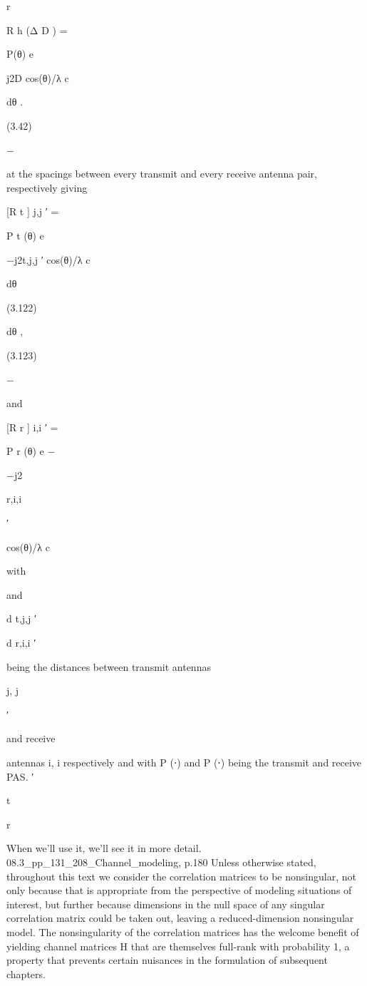 {{{{r

\pi

R h (Δ D ) = \int

P(θ) e

j2 D cos(θ)/λ c

dθ .

(3.42)

−\pi

at the spacings between every transmit and every receive antenna pair, respectively giving
\pi

[R t ] j,j ′ = \int

P t (θ) e

−j2\pid t,j,j ′ cos(θ)/λ c

dθ

(3.122)

dθ ,

(3.123)

−\pi

and
\pi

[R r ] i,i ′ = \int

P r (θ) e
−\pi

−j2\pid

r,i,i

′

cos(θ)/λ c

with

and

d t,j,j ′

d r,i,i ′

being the distances between transmit antennas

j, j

′

and receive

antennas i, i respectively and with P (⋅) and P (⋅) being the transmit and receive PAS.
′

t

r

When we'll use it, we'll see it in more detail.
08.3_pp_131_208_Channel_modeling, p.180 Unless otherwise stated, throughout this text we consider the correlation matrices to be nonsingular, not only because that is appropriate from the perspective of modeling situations of interest, but further because dimensions in the null space of any singular correlation matrix could be taken out, leaving a reduced-dimension nonsingular model. The nonsingularity of the correlation matrices has the welcome benefit of yielding channel matrices H that are themselves full-rank with probability 1, a property that prevents certain nuisances in the formulation of subsequent chapters.

}}}}
